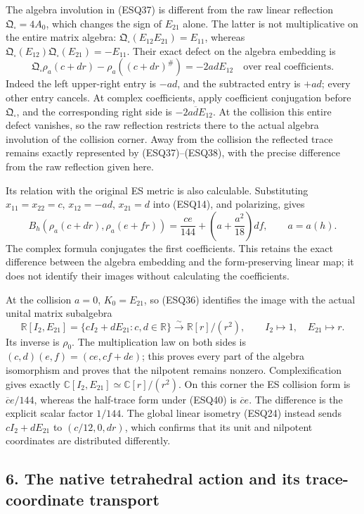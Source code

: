 \documentclass[
  10pt,
  a4paper,
]{article}
\begin{document}
The algebra involution in (ESQ37) is different from the raw linear
reflection \(\mathfrak Q_\square=4A_0\), which changes the sign of
\(E_{21}\) alone. The latter is not multiplicative on the entire matrix
algebra: \(\mathfrak Q_\square(E_{12}E_{21})=E_{11}\), whereas
\(\mathfrak Q_\square(E_{12})\mathfrak Q_\square(E_{21})=-E_{11}\).
Their exact defect on the algebra embedding is \[
\mathfrak Q_\square\rho_a(c+dr)-\rho_a((c+dr)^\#)
=-2adE_{12}
\quad\text{over real coefficients}.
\tag{ESQ38a}
\] Indeed the left upper-right entry is \(-ad\), and the subtracted
entry is \(+ad\); every other entry cancels. At complex coefficients,
apply coefficient conjugation before \(\mathfrak Q_\square\), and the
corresponding right side is \(-2a\overline d E_{12}\). At the collision
this entire defect vanishes, so the raw reflection restricts there to
the actual algebra involution of the collision corner. Away from the
collision the reflected trace remains exactly represented by
(ESQ37)--(ESQ38), with the precise difference from the raw reflection
given here.

Its relation with the original ES metric is also calculable.
Substituting \(x_{11}=x_{22}=c\), \(x_{12}=-ad\), \(x_{21}=d\) into
(ESQ14), and polarizing, gives \[
B_h(\rho_a(c+dr),\rho_a(e+fr))
=\frac{ce}{144}+\left(a+\frac{a^2}{18}\right)df,
\qquad a=a(h).
\tag{ESQ39}
\] The complex formula conjugates the first coefficients. This retains
the exact difference between the algebra embedding and the
form-preserving linear map; it does not identify their images without
calculating the coefficients.

At the collision \(a=0\), \(K_0=E_{21}\), so (ESQ36) identifies the
image with the actual unital matrix subalgebra \[
\mathbb R[I_2,E_{21}]
=\{cI_2+dE_{21}:c,d\in\mathbb R\}
\xrightarrow{\sim}\mathbb R[r]/(r^2),
\qquad I_2\longmapsto1,\quad E_{21}\longmapsto r.
\tag{ESQ40}
\] Its inverse is \(\rho_0\). The multiplication law on both sides is
\((c,d)(e,f)=(ce,cf+de)\); this proves every part of the algebra
isomorphism and proves that the nilpotent remains nonzero.
Complexification gives exactly
\(\mathbb C[I_2,E_{21}]\simeq\mathbb C[r]/(r^2)\). On this corner the ES
collision form is \(\overline c e/144\), whereas the half-trace form
under (ESQ40) is \(\overline c e\). The difference is the explicit
scalar factor \(1/144\). The global linear isometry (ESQ24) instead
sends \(cI_2+dE_{21}\) to \((c/12,0,dr)\), which confirms that its unit
and nilpotent coordinates are distributed differently.

\subsection{6. The native tetrahedral action and its trace-coordinate
transport}\label{the-native-tetrahedral-action-and-its-trace-coordinate-transport}
\end{document}
